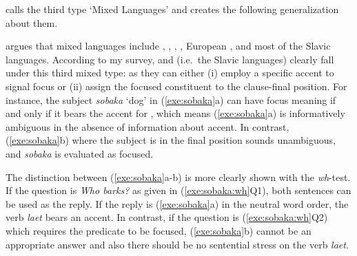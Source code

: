 \citet{buring:10} calls the third type `Mixed Languages' and creates
the following generalization about them.




\noindent \citeauthor{buring:10} argues that mixed languages include
, , , , European
, and most of the Slavic languages. According to my
survey,  and  (i.e.\ the
Slavic languages) clearly fall under this third mixed type: as they
can either (i) employ a specific accent to signal focus or (ii) assign
the focused constituent to the clause-final position.
For instance, the subject \textit{sobaka} `dog' in (\ref{exe:sobaka}a)
can have focus meaning if and only if it bears the accent for ,
which means (\ref{exe:sobaka}a) is informatively ambiguous in the
absence of information about accent.  In contrast, (\ref{exe:sobaka}b)
where the subject is in the final position sounds unambiguous, and
\textit{sobaka} is evaluated as focused.




\noindent The distinction between (\ref{exe:sobaka}a-b) is more
clearly shown with the \textit{wh}-test. If the question is 
\textit{Who barks?} as given in (\ref{exe:sobaka:wh}Q1), both
sentences can be used as the reply. If the reply is
(\ref{exe:sobaka}a) in the neutral word order, the verb \textit{laet}
bears an accent. In contrast, if the question is
(\ref{exe:sobaka:wh}Q2) which requires the predicate to be focused,
(\ref{exe:sobaka}b) cannot be an appropriate answer and also there
should be no sentential stress on the verb
\textit{laet}.




